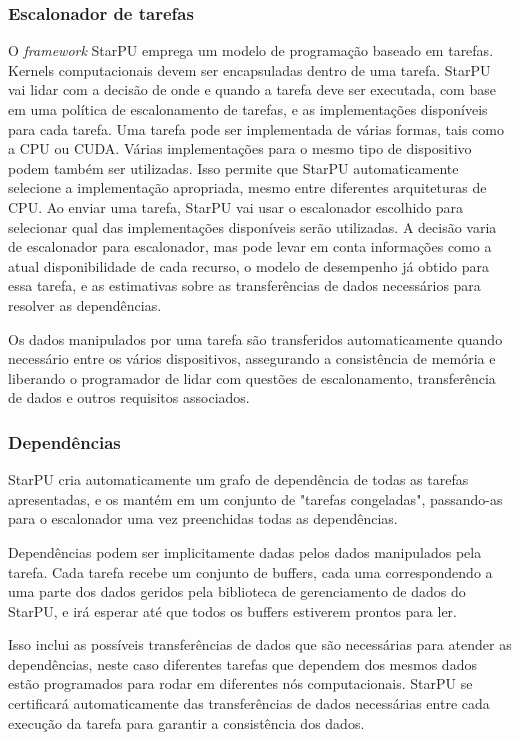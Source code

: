 \subsubsection{Escalonador de tarefas}

O \textit{framework} StarPU emprega um modelo de programação baseado em tarefas. Kernels computacionais devem ser encapsuladas dentro de uma tarefa. StarPU vai lidar com a decisão de onde e quando a tarefa deve ser executada, com base em uma política de escalonamento de tarefas, e as implementações disponíveis para cada tarefa. Uma tarefa pode ser implementada de várias formas, tais como a CPU ou CUDA. Várias implementações para o mesmo tipo de dispositivo podem também ser utilizadas. Isso permite que StarPU automaticamente selecione a implementação apropriada, mesmo entre diferentes arquiteturas de CPU. Ao enviar uma tarefa, StarPU vai usar o escalonador escolhido para selecionar qual das implementações disponíveis serão utilizadas. A decisão varia de escalonador para escalonador, mas pode levar em conta informações como a atual disponibilidade de cada recurso, o modelo de desempenho já obtido para essa tarefa, e as estimativas sobre as transferências de dados necessários para resolver as dependências. 

Os dados manipulados por uma tarefa são transferidos automaticamente quando necessário entre os vários dispositivos, assegurando a consistência de memória e liberando o programador de lidar com questões de escalonamento, transferência de dados e outros requisitos associados.

\subsubsection{Dependências}

StarPU cria automaticamente um grafo de dependência de todas as tarefas apresentadas, e os mantém em um conjunto de "tarefas congeladas", passando-as para o escalonador uma vez preenchidas todas as dependências. 

Dependências podem ser implicitamente dadas pelos dados manipulados pela tarefa. Cada tarefa recebe um conjunto de buffers, cada uma correspondendo a uma parte dos dados geridos pela  biblioteca de gerenciamento de dados do StarPU, e irá esperar até que todos os buffers estiverem prontos para ler.

Isso inclui as possíveis transferências de dados que são necessárias para atender as dependências, neste caso diferentes tarefas que dependem dos mesmos dados estão programados para rodar em diferentes nós computacionais. StarPU se certificará automaticamente das transferências de dados necessárias entre cada execução da tarefa para garantir a consistência dos dados. 

